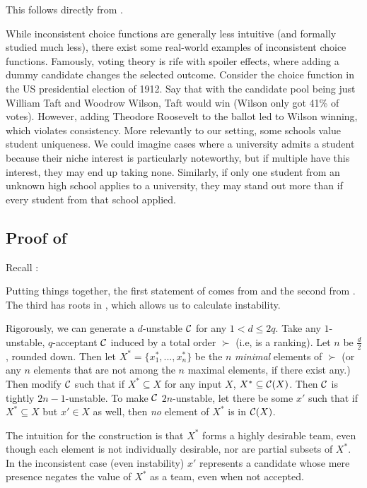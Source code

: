 This follows directly from .

While inconsistent choice functions are generally less intuitive (and formally studied much less), there exist some real-world examples of inconsistent choice functions. Famously, voting theory is rife with spoiler effects, where adding a dummy candidate changes the selected outcome. Consider the choice function in the US presidential election of 1912. Say that with the candidate pool being just William Taft and Woodrow Wilson, Taft would win (Wilson only got 41\% of votes). However, adding Theodore Roosevelt to the ballot led to Wilson winning, which violates consistency.
More relevantly to our setting, some schools value student uniqueness. We could imagine cases where a university admits a student because their niche interest is particularly noteworthy, but if multiple have this interest, they may end up taking none. Similarly, if only one student from an unknown high school applies to a university, they may stand out more than if every student from that school applied.

\subsection{Proof of } \label{sec:instability-proof}

Recall :
\thminstability*

Putting things together, the first statement of  comes from  and the second from . The third
has roots in , which allows us to calculate instability.

Rigorously, we can generate a $d$-unstable $\mathcal{C}$ for any $1 < d \leq 2q$. Take any $1$-unstable, $q$-acceptant $\mathcal{C}$ induced by a total order $\succ$ (i.e, is a ranking). Let $n$ be $\frac{d}{2}$, rounded down. Then let $X^* = \{x^*_1, ..., x^*_n\}$ be the $n$ \textit{minimal} elements of $\succ$ (or any $n$ elements that are not among the $n$ maximal elements, if there exist any.) Then modify $\mathcal{C}$ such that if $X^* \subseteq X$ for any input $X$, $X^* \subseteq \mathcal{C}(X)$. Then $\mathcal{C}$ is tightly $2n-1$-unstable. To make $\mathcal{C}$ $2n$-unstable, let there be some $x'$ such that if $X^* \subseteq X$ but $x' \in X$ as well, then \textit{no} element of $X^*$ is in $\mathcal{C}(X)$. %

The intuition for the construction is that $X^*$ forms a highly desirable team, even though each element is not individually desirable, nor are partial subsets of $X^*$.
In the inconsistent case (even instability) $x'$ represents a candidate whose mere presence negates the value of $X^*$ as a team, even when not accepted.

